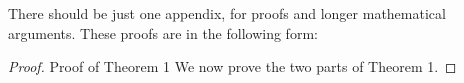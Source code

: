 \documentclass[12pt]{TD-CJS}
\begin{document}
\begin{appendix}
There should be just one appendix, for proofs and longer
mathematical arguments. These proofs are in the following form:

\begin{proof}{Proof of Theorem 1}{}%
We now prove the two parts of Theorem 1.
\end{proof}
\end{appendix}

\CJShistory
\end{document}
